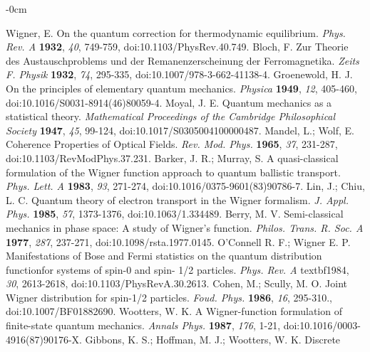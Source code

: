 \documentclass[quantumrep,article,submit,pdftex,moreauthors]{Definitions/mdpi}
\begin{document}
\begin{adjustwidth}{-\extralength}{0cm}
\begin{thebibliography}{999}
 Wigner, E. On the quantum correction for thermodynamic
equilibrium. \textit{Phys. Rev. A} \textbf{1932}, \textit{40}, 749-759,
doi:10.1103/PhysRev.40.749.
 Bloch, F. Zur Theorie des Austauschproblems und der
Remanenzerscheinung der Ferromagnetika. \textit{Zeits F. Physik} \textbf{1932},
\textit{74}, 295-335, doi:10.1007/978-3-662-41138-4.
 Groenewold, H. J. On the principles of elementary
quantum mechanics. \textit{Physica} \textbf{1949}, \textit{12}, 405-460,
doi:10.1016/S0031-8914(46)80059-4.
 Moyal, J. E. Quantum mechanics as a statistical theory. 
\textit{Mathematical Proceedings of the Cambridge Philosophical Society} 
\textbf{1947}, \textit{45}, 99-124, doi:10.1017/S0305004100000487.
 Mandel, L.; Wolf, E. Coherence Properties of Optical
Fields. \textit{Rev. Mod. Phys.} \textbf{1965}, \textit{37}, 231-287,
doi:10.1103/RevModPhys.37.231.
 Barker, J. R.; Murray, S. A quasi-classical formulation
of the Wigner function approach to quantum ballistic transport. \textit{Phys.
Lett. A} \textbf{1983}, \textit{93}, 271-274, doi:10.1016/0375-9601(83)90786-7.
 Lin, J.; Chiu, L. C. Quantum theory of electron
transport in the Wigner formalism. \textit{J. Appl. Phys.} \textbf{1985}, 
\textit{57}, 1373-1376, doi:10.1063/1.334489.
 Berry, M. V. Semi-classical mechanics in phase space: A
study of Wigner's function. \textit{Philos. Trans. R. Soc. A} \textbf{1977}, 
\textit{287}, 237-271, doi:10.1098/rsta.1977.0145.
 O'Connell R. F.; Wigner E. P. Manifestations of Bose and
Fermi statistics on the quantum distribution functionfor systems of spin-0
and spin- 1/2 particles. \textit{Phys. Rev. A} textbf{1984}, \textit{30},
2613-2618, doi:10.1103/PhysRevA.30.2613.
 Cohen, M.; Scully, M. O. Joint Wigner distribution for
spin-1/2 particles. \textit{Foud. Phys.} \textbf{1986}, \textit{16},
295-310., doi:10.1007/BF01882690.
 Wootters, W. K. A Wigner-function formulation of
finite-state quantum mechanics. \textit{Annals Phys.} \textbf{1987},
\textit{176}, 1-21, doi:10.1016/0003-4916(87)90176-X.
 Gibbons, K. S.; Hoffman, M. J.; Wootters, W. K. Discrete

\end{thebibliography}
\end{adjustwidth}
\end{document}
